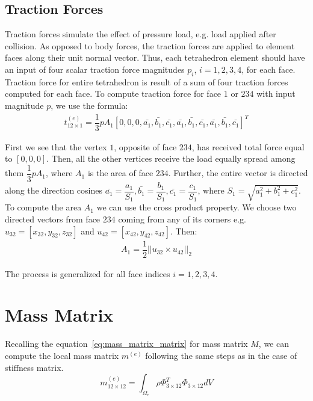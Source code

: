 \documentclass[en]{minipw} %
\begin{document}
\subsection{Traction Forces}
Traction forces simulate the effect of pressure load, e.g. load applied after collision. As opposed to body forces, the traction forces are applied to element faces along their unit normal vector. Thus, each tetrahedron element should have an input of four scalar traction force magnitudes $p_i$, $i=1,2,3,4$, for each face. Traction force for entire tetrahedron is result of a sum of four traction forces computed for each face. To compute traction force for face $1$ or $234$ with input magnitude $p$, we use the formula:
\begin{equation}
\begin{aligned}
t^{(e)}_{12 \times 1} = \dfrac{1}{3} p A_1 [0, 0, 0, \bar{a_1}, \bar{b_1}, \bar{c_1}, \bar{a_1}, \bar{b_1}, \bar{c_1},\bar{a_1}, \bar{b_1}, \bar{c_1}]^{T} 
\end{aligned}
\end{equation}

First we see that the vertex $1$, opposite of face $234$, has received total force equal to $[0,0,0]$. Then, all the other vertices receive the load equally spread among them $\dfrac{1}{3}p A_1$, where $A_1$ is the area of face $234$. Further, the entire vector is directed along the direction cosines $\bar{a_1} = \dfrac{a_1}{S_1}, \bar{b_1} = \dfrac{b_1}{S_1}, \bar{c_1} = \dfrac{c_1}{S_1}$, where $S_1 = \sqrt{a^{2}_{1} + b^{2}_{1} + c^{2}_{1}}$. To compute the area $A_1$ we can use the cross product property. We choose two directed vectors from face $234$ coming from any of its corners e.g. $u_{32} = [x_{32}, y_{32}, z_{32}]$ and $u_{42} = [x_{42}, y_{42}, z_{42}]$. Then:
\begin{equation}
\begin{aligned}
A_1 = \dfrac{1}{2} ||u_{32} \times u_{42}||_{2}
\end{aligned}
\end{equation}

The process is generalized for all face indices $i = 1,2,3,4$.

\section{Mass Matrix}
Recalling the equation~\ref{eq:mass_matrix_matrix} for mass matrix $M$, we can compute the local mass matrix $m^{(e)}$ following the same steps as in the case of stiffness matrix.
\begin{equation}
m^{(e)}_{12 \times 12} =  \int_{\Omega_{e}} \rho \Phi^{T}_{3 \times 12} \Phi_{3 \times 12} dV
\end{equation}
\end{document}

